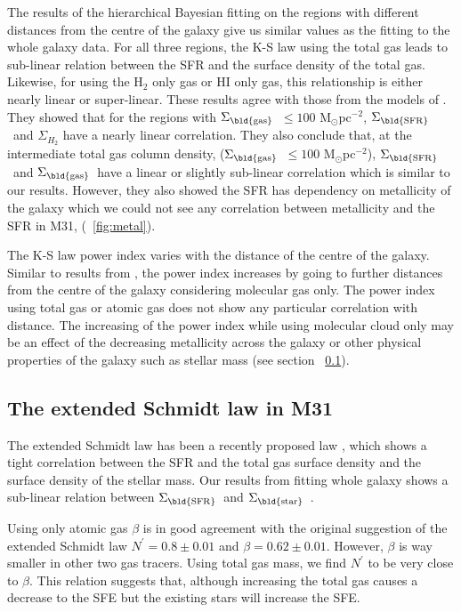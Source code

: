 \documentclass[useAMS,usenatbib]{mn2e}
\newcommand \sigmagas    {$\Sigma_{\rm \bld {gas }} $\ }
\newcommand \sigmasfr     {$\Sigma_{\rm \bld {SFR }} $\ }
\newcommand \sigmastar    {$\Sigma_{\rm \bld {star }} $\ }
\newcommand \eqnprime {N^\prime}
\begin{document}
The results of the hierarchical Bayesian fitting on the regions with different distances from the centre of the galaxy give us similar values as the fitting to the whole galaxy data. For all three regions, the K-S law using the total gas leads to sub-linear relation between the SFR and the surface density of the total gas. Likewise, for using the H$_{2}$ only gas or HI only gas, this relationship is either nearly linear or super-linear. These results agree with those from the models of \cite{Krumholz09}. They showed that for the regions with \sigmagas $\leq 100$ M$_{\odot}$pc$^{-2}$, \sigmasfr and $\Sigma_{H_2}$ have a nearly linear correlation. They also conclude that, at the intermediate total gas column density, (\sigmagas $\leq 100$ M$_{\odot}$pc$^{-2}$), \sigmasfr and \sigmagas have a linear or slightly sub-linear correlation which is similar to our results. However, they also showed the SFR has dependency on metallicity of the galaxy which we could not see any correlation between metallicity and the SFR in M31, (~\ref{fig:metal}). 

The K-S law power index varies with the distance of the centre of the galaxy. Similar to results from \cite{Ford13}, the power index increases by going to further distances from the centre of the galaxy considering molecular gas only. The power index using total gas or atomic gas does not show any particular correlation with distance. The increasing of the power index while using molecular cloud only may be an effect of the decreasing metallicity across the galaxy or other physical properties of the galaxy such as stellar mass (see section ~\ref{sec:es_res}).

  
\subsection{The extended Schmidt law in M31}
\label{sec:es_res}
The extended Schmidt law has been a recently proposed law \citep{Shi11}, which shows a tight correlation between the SFR and the total gas surface density and the surface density of the stellar mass. Our results from fitting whole galaxy shows a sub-linear relation between \sigmasfr and \sigmastar.

Using only atomic gas $\beta$ is in good agreement with the original suggestion of the extended Schmidt law $\eqnprime = 0.8 \pm 0.01$ and $\beta = 0.62\pm0.01$. However, $\beta$ is way smaller in other two gas tracers. Using total gas mass, we find $\eqnprime$ to be very close to $\beta$. This relation suggests that, although increasing the total gas causes a decrease to the SFE but the existing stars will increase the SFE. 
\end{document}

